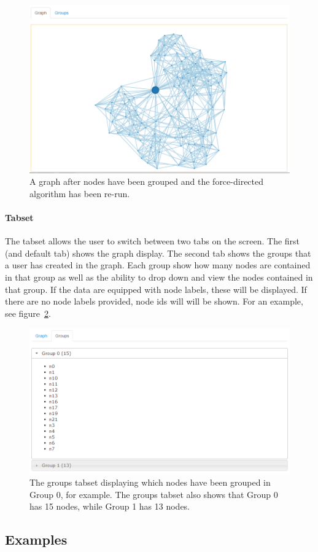 \documentclass{article}
\begin{document}
\begin{figure}[H]
\centering
\includegraphics[width=\textwidth]{images/graphgroup.png}
\caption{\label{fig:graphgroup} A graph after nodes have been grouped and the force-directed algorithm has been re-run.}
\end{figure}

\paragraph{Tabset}
The tabset allows the user to switch between two tabs on the screen. The first (and default tab) shows the graph display. The second tab shows the groups that a user has created in the graph. Each group show how many nodes are contained in that group as well as the ability to drop down and view the nodes contained in that group. If the data are equipped with node labels, these will be displayed. If there are no node labels provided, node ids will will be shown. For an example, see figure~\ref{fig:groupstab}.

\begin{figure}[H]
\centering
\includegraphics[width=\textwidth]{images/groupstab.png}
\caption{\label{fig:groupstab} The groups tabset displaying which nodes have been grouped in Group 0, for example. The groups tabset also shows that Group 0 has 15 nodes, while Group 1 has 13 nodes.}
\end{figure}


\subsection{Examples}
\end{document}
